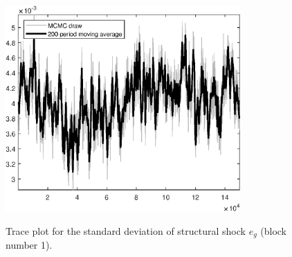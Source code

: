 \begin{figure}[H]
\centering
  \includegraphics[width=0.8\textwidth]{BRS_gen/graphs/TracePlot_SE_e_g_blck_1}\\
    \caption{Trace plot for the standard deviation of structural shock ${e_g}$ (block number 1).}
\end{figure}
